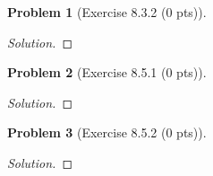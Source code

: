 \documentclass{article}
\theoremstyle{definition}
\newtheorem{problem}{Problem}
\theoremstyle{plain}
\begin{document}
\begin{problem}[Exercise 8.3.2 (0 pts)]
\end{problem}
\begin{adjustwidth}{0.7cm}{}
\color{blue}
\begin{proof}[Solution]
\color{black}
\end{proof}
\end{adjustwidth}

\begin{problem}[Exercise 8.5.1 (0 pts)]
\end{problem}
\begin{adjustwidth}{0.7cm}{}
\color{blue}
\begin{proof}[Solution]
\color{black}
\end{proof}
\end{adjustwidth}

\begin{problem}[Exercise 8.5.2 (0 pts)]
\end{problem}
\begin{adjustwidth}{0.7cm}{}
\color{blue}
\begin{proof}[Solution]
\color{black}
\end{proof}
\end{adjustwidth}
\end{document}
